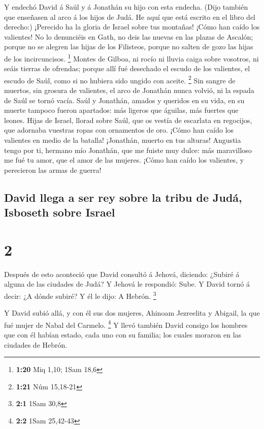  Y endechó David á Saúl y á Jonathán su hijo con esta
endecha.  (Dijo también que enseñasen al arco á los hijos
de Judá. He aquí que está escrito en el libro del derecho:)
 ¡Perecido ha la gloria de Israel sobre tus montañas!
¡Cómo han caído los valientes!  No lo denunciéis en Gath,
no deis las nuevas en las plazas de Ascalón; porque no se alegren las
hijas de los Filisteos, porque no salten de gozo las hijas de los
incircuncisos. \footnote{\textbf{1:20} Miq 1,10; 1Sam 18,6}
 Montes de Gilboa, ni rocío ni lluvia caiga sobre
vosotros, ni seáis tierras de ofrendas; porque allí fué desechado el
escudo de los valientes, el escudo de Saúl, como si no hubiera sido
ungido con aceite. \footnote{\textbf{1:21} Núm 15,18-21} 
Sin sangre de muertos, sin grosura de valientes, el arco de Jonathán
nunca volvió, ni la espada de Saúl se tornó vacía.  Saúl
y Jonathán, amados y queridos en su vida, en su muerte tampoco fueron
apartados: más ligeros que águilas, más fuertes que leones.
 Hijas de Israel, llorad sobre Saúl, que os vestía de
escarlata en regocijos, que adornaba vuestras ropas con ornamentos de
oro.  ¡Cómo han caído los valientes en medio de la
batalla! ¡Jonathán, muerto en tus alturas!  Angustia
tengo por ti, hermano mío Jonathán, que me fuiste muy dulce: más
maravilloso me fué tu amor, que el amor de las mujeres. 
¡Cómo han caído los valientes, y perecieron las armas de guerra!

\hypertarget{david-llega-a-ser-rey-sobre-la-tribu-de-juduxe1-isboseth-sobre-israel}{%
\subsection{David llega a ser rey sobre la tribu de Judá, Isboseth sobre
Israel}\label{david-llega-a-ser-rey-sobre-la-tribu-de-juduxe1-isboseth-sobre-israel}}

\hypertarget{section-1}{%
\section{2}\label{section-1}}

 Después de esto aconteció que David consultó á Jehová,
diciendo: ¿Subiré á alguna de las ciudades de Judá? Y Jehová le
respondió: Sube. Y David tornó á decir: ¿A dónde subiré? Y él le dijo: A
Hebrón. \footnote{\textbf{2:1} 1Sam 30,8}

 Y David subió allá, y con él sus dos mujeres, Ahinoam
Jezreelita y Abigail, la que fué mujer de Nabal del Carmelo. \footnote{\textbf{2:2}
  1Sam 25,42-43}  Y llevó también David consigo los
hombres que con él habían estado, cada uno con su familia; los cuales
moraron en las ciudades de Hebrón.

